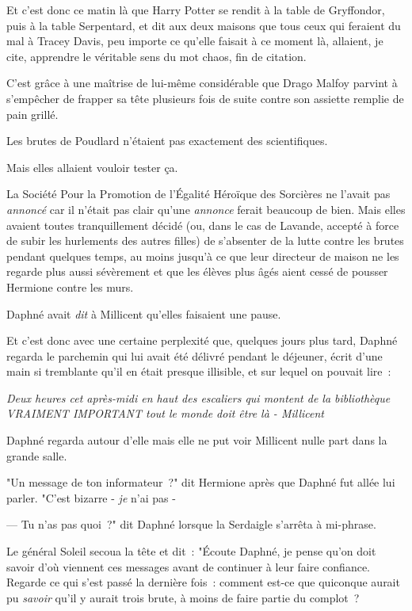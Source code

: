 \later

Et c'est donc ce matin là que Harry Potter se rendit à la table de Gryffondor, puis à la table Serpentard, et dit aux deux maisons que tous ceux qui feraient du mal à Tracey Davis, peu importe ce qu'elle faisait à ce moment là, allaient, je cite, apprendre le véritable sens du mot chaos, fin de citation.

C'est grâce à une maîtrise de lui-même considérable que Drago Malfoy parvint à s'empêcher de frapper sa tête plusieurs fois de suite contre son assiette remplie de pain grillé.

Les brutes de Poudlard n'étaient pas exactement des scientifiques.

Mais elles allaient vouloir tester ça.

\later

La Société Pour la Promotion de l'Égalité Héroïque des Sorcières ne l'avait pas \emph{annoncé} car il n'était pas clair qu'une \emph{annonce} ferait beaucoup de bien. Mais elles avaient toutes tranquillement décidé (ou, dans le cas de Lavande, accepté à force de subir les hurlements des autres filles) de s'absenter de la lutte contre les brutes pendant quelques temps, au moins jusqu'à ce que leur directeur de maison ne les regarde plus aussi sévèrement et que les élèves plus âgés aient cessé de pousser Hermione contre les murs.

Daphné avait \emph{dit} à Millicent qu'elles faisaient une pause.

Et c'est donc avec une certaine perplexité que, quelques jours plus tard, Daphné regarda le parchemin qui lui avait été délivré pendant le déjeuner, écrit d'une main si tremblante qu'il en était presque illisible, et sur lequel on pouvait lire~:

\emph{Deux heures cet après-midi en haut des escaliers qui montent de la bibliothèque VRAIMENT IMPORTANT tout le monde doit être là - Millicent}

Daphné regarda autour d'elle mais elle ne put voir Millicent nulle part dans la grande salle.

"Un message de ton informateur~?" dit Hermione après que Daphné fut allée lui parler. "C'est bizarre - \emph{je} n'ai pas -

--- Tu n'as pas quoi~?" dit Daphné lorsque la Serdaigle s'arrêta à mi-phrase.

Le général Soleil secoua la tête et dit~: "Écoute Daphné, je pense qu'on doit savoir d'où viennent ces messages avant de continuer à leur faire confiance. Regarde ce qui s'est passé la dernière fois~: comment est-ce que quiconque aurait pu \emph{savoir} qu'il y aurait trois brute, à moins de faire partie du complot~?

